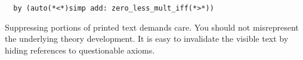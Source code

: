 \begin{isabellebody}
\begin{isamarkuptext}
\begin{verbatim}
  by (auto(*<*)simp add: zero_less_mult_iff(*>*))
\end{verbatim}

  \medskip Suppressing portions of printed text demands care.  You
  should not misrepresent the underlying theory development.  It is
  easy to invalidate the visible text by hiding references to
  questionable axioms.%
\end{isamarkuptext}%
\isamarkuptrue%
%
\isadelimtheory
%
\endisadelimtheory
%
\isatagtheory
%
\endisatagtheory
{\isafoldtheory}%
%
\isadelimtheory
%
\endisadelimtheory
\end{isabellebody}%
